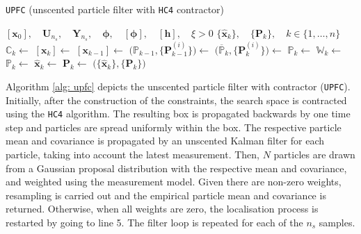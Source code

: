 \begin{algorithm*}[t]
\caption[Unscented particle filter with \texttt{HC4} contractor (\texttt{UPFC})]{\texttt{UPFC} (unscented particle filter with \texttt{HC4} contractor)}
\label{alg: upfc}
\begin{algorithmic}[1]
\Require $[\bm{x}_0], \quad \bm{U}_{n_s}, \quad \bm{Y}_{n_s}, \quad \bm{\phi}, \quad [\bm{\phi}], \quad [\bm{h}], \quad \xi > 0$ 
\Ensure $\big\{\hat{\bm{x}}_k\big\}, \quad \big\{\bm{P}_k\big\}, \quad k \in \{1, \dots, n\}$
\Statex
{}
\State $\mathbb{C}_k \gets$  
 
	\State $[\bm{x}_{k}] \gets$  \label{marker} 
	\State $[\bm{x}_{k-1}] \gets$  
    \State $\Big(\mathbb{P}_{k-1}, \big\{\bm{P}^{(i)}_{k-1}\big\}\Big) \gets$  
 \EndIf
 \State $\Big(\overline{\mathbb{P}}_{k}, \big\{\bm{P}^{(i)}_k\big\}\Big) \gets$  
 \State $\mathbb{P}_{k} \gets$  
 \State $\mathbb{W}_{k} \gets$  
  
 \State {}
 \EndIf
 \State $\mathbb{P}_{k} \gets$  
 \State $\hat{\bm{x}}_k \gets$  
 \State $\bm{P}_k \gets$  
\EndFor
\State \Return $\Big(\big\{\hat{\bm{x}}_k\big\}, \big\{\bm{P}_k\big\}\Big)$ 
\EndFunction
\end{algorithmic}
\end{algorithm*}

Algorithm \ref{alg: upfc} depicts the unscented particle filter with contractor (\texttt{UPFC}). Initially, after the construction of the constraints, the search space is contracted using the \texttt{HC4} algorithm. The resulting box is propagated backwards by one time step and particles are spread uniformly within the box. The respective particle mean and covariance is propagated by an unscented Kalman filter for each particle, taking into account the latest measurement. Then, $N$ particles are drawn from a Gaussian proposal distribution with the respective mean and covariance, and weighted using the measurement model. Given there are non-zero weights, resampling is carried out and the empirical particle mean and covariance is returned. Otherwise, when all weights are zero, the localisation process is restarted by going to line 5. The filter loop is repeated for each of the $n_s$ samples.



